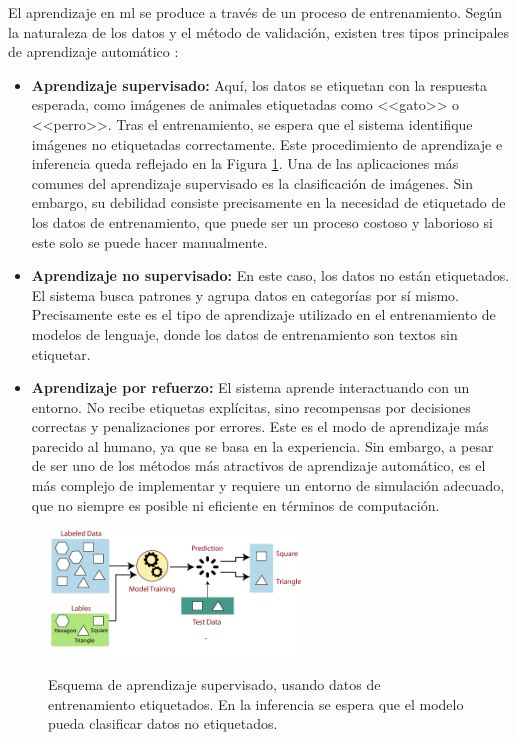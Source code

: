 El aprendizaje en \gls{ml} se produce a través de un proceso de entrenamiento. Según la naturaleza de los datos y el método de validación, existen tres tipos principales de aprendizaje automático \citep[p. ~38]{torresivinalsPythonDeepLearning2020}:

\begin{itemize}
    \item \textbf{Aprendizaje supervisado:} Aquí, los datos se etiquetan con la respuesta esperada, como imágenes de animales etiquetadas como <<gato>> o <<perro>>. Tras el entrenamiento, se espera que el sistema identifique imágenes no etiquetadas correctamente. Este procedimiento de aprendizaje e inferencia queda reflejado en la Figura \ref{fig:labeled_data_training}. Una de las aplicaciones más comunes del aprendizaje supervisado es la clasificación de imágenes. Sin embargo, su debilidad consiste precisamente en la necesidad de etiquetado de los datos de entrenamiento, que puede ser un proceso costoso y laborioso si este solo se puede hacer manualmente.
    
    \item \textbf{Aprendizaje no supervisado:} En este caso, los datos no están etiquetados. El sistema busca patrones y agrupa datos en categorías por sí mismo. Precisamente este es el tipo de aprendizaje utilizado en el entrenamiento de modelos de lenguaje, donde los datos de entrenamiento son textos sin etiquetar.
    
    \item \textbf{Aprendizaje por refuerzo:} El sistema aprende interactuando con un entorno. No recibe etiquetas explícitas, sino recompensas por decisiones correctas y penalizaciones por errores. Este es el modo de aprendizaje más parecido al humano, ya que se basa en la experiencia. Sin embargo, a pesar de ser uno de los métodos más atractivos de aprendizaje automático, es el más complejo de implementar y requiere un entorno de simulación adecuado, que no siempre es posible ni eficiente en términos de computación.
\end{itemize}

\begin{figure}[H]
    \caption[Esquema de aprendizaje supervisado]{Esquema de aprendizaje supervisado, usando datos de entrenamiento etiquetados. En la inferencia se espera que el modelo pueda clasificar datos no etiquetados.}
    \centering
    \includegraphics[width=0.6\textwidth]{./figuras/labeled_data_training.png}
    \label{fig:labeled_data_training}
\end{figure}


